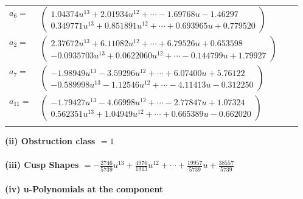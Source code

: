 \documentclass[1p]{elsarticle_modified}
\theoremstyle{definition}
\begin{document}
\begin{tabular}{m{7pt} m{180pt} m{7pt} m{180pt} }
\flushright $a_{6}=$&$\begin{pmatrix}1.04374 u^{13}+2.01934 u^{12}+\cdots-1.69768 u-1.46297\\0.349771 u^{13}+0.851891 u^{12}+\cdots+0.693965 u+0.779520\end{pmatrix}$ \\
\flushright $a_{2}=$&$\begin{pmatrix}2.37672 u^{13}+6.11082 u^{12}+\cdots+6.79526 u+0.653598\\-0.0935703 u^{13}+0.0622060 u^{12}+\cdots-0.144799 u+1.79927\end{pmatrix}$ \\
\flushright $a_{7}=$&$\begin{pmatrix}-1.98949 u^{13}-3.59296 u^{12}+\cdots+6.07400 u+5.76122\\-0.589998 u^{13}-1.12546 u^{12}+\cdots-4.11413 u-0.312250\end{pmatrix}$ \\
\flushright $a_{11}=$&$\begin{pmatrix}-1.79427 u^{13}-4.66998 u^{12}+\cdots-2.77847 u+1.07324\\0.562351 u^{13}+1.04949 u^{12}+\cdots+0.665389 u-0.662020\end{pmatrix}$\\&\end{tabular}
\flushleft \textbf{(ii) Obstruction class $= 1$}\\~\\
\flushleft \textbf{(iii) Cusp Shapes $= -\frac{2746}{5739} u^{13}+\frac{4976}{1913} u^{12}+\cdots+\frac{19957}{5739} u+\frac{38557}{5739}$}\\~\\
\newpage\renewcommand{\arraystretch}{1}
\flushleft \textbf{(iv) u-Polynomials at the component}\newline \\
\end{document}

